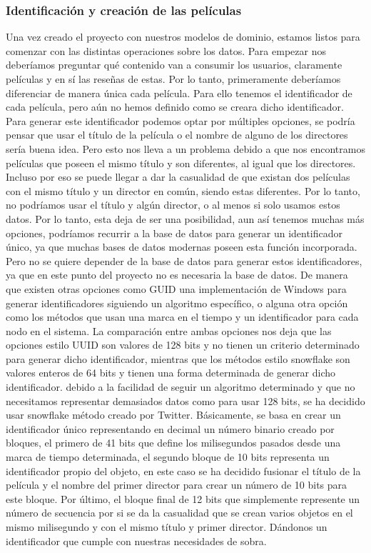 \subsubsection{Identificación y creación de las películas}

Una vez creado el proyecto con nuestros modelos de dominio, estamos listos para comenzar con las 
distintas operaciones sobre los datos. Para empezar nos deberíamos preguntar qué contenido van a 
consumir los usuarios, claramente películas y en sí las reseñas de estas. Por lo tanto, primeramente 
deberíamos diferenciar de manera única cada película. Para ello tenemos el identificador de cada 
película, pero aún no hemos definido como se creara dicho identificador. Para generar este 
identificador podemos optar por múltiples opciones, se podría pensar que usar el título de la película 
o el nombre de alguno de los directores sería buena idea. Pero esto nos lleva a un problema debido a 
que nos encontramos películas que poseen el mismo título y son diferentes, al igual que los directores. 
Incluso por eso se puede llegar a dar la casualidad de que existan dos películas con el mismo título y 
un director en común, siendo estas diferentes. Por lo tanto, no podríamos usar el título y algún 
director, o al menos si solo usamos estos datos. Por lo tanto, esta deja de ser una posibilidad, aun 
así tenemos muchas más opciones, podríamos recurrir a la base de datos para generar un identificador 
único, ya que muchas bases de datos modernas poseen esta función incorporada. Pero no se quiere 
depender de la base de datos para generar estos identificadores, ya que en este punto del proyecto no 
es necesaria la base de datos. De manera que existen otras opciones como GUID una implementación de 
Windows para generar identificadores siguiendo un algoritmo específico, o alguna otra opción como los 
métodos que usan una marca en el tiempo y un identificador para cada nodo en el sistema. La comparación 
entre ambas opciones \cite{compSnowUUID} nos deja que las opciones estilo UUID son valores de 128 bits 
y no tienen un criterio determinado para generar dicho identificador, mientras que los métodos estilo 
snowflake son valores enteros de 64 bits y tienen una forma determinada de generar dicho identificador. 
debido a la facilidad de seguir un algoritmo determinado y que no necesitamos representar demasiados 
datos como para usar 128 bits, se ha decidido usar snowflake \cite{snowF} método creado por Twitter. 
Básicamente, se basa en crear un identificador único representando en decimal un número binario creado 
por bloques, el primero de 41 bits que define los milisegundos pasados desde una marca de tiempo 
determinada, el segundo bloque de 10 bits representa un identificador propio del objeto, en este caso 
se ha decidido fusionar el título de la película y el nombre del primer director para crear un número 
de 10 bits para este bloque. Por último, el bloque final de 12 bits que simplemente represente un 
número de secuencia por si se da la casualidad que se crean varios objetos en el mismo milisegundo y 
con el mismo título y primer director. Dándonos un identificador que cumple con nuestras necesidades de 
sobra.

